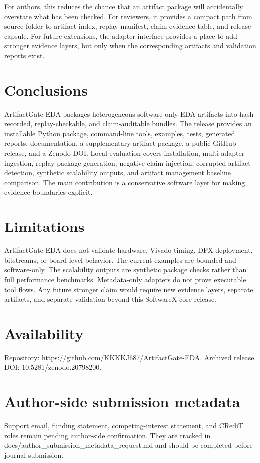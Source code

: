 \documentclass[preprint,12pt]{elsarticle}
\begin{document}
For authors, this reduces the chance that an artifact package will accidentally
overstate what has been checked. For reviewers, it provides a compact path from
source folder to artifact index, replay manifest, claim-evidence table, and
release capsule. For future extensions, the adapter interface provides a place
to add stronger evidence layers, but only when the corresponding artifacts and
validation reports exist.

\section{Conclusions}
ArtifactGate-EDA packages heterogeneous software-only EDA artifacts into
hash-recorded, replay-checkable, and claim-auditable bundles. The release
provides an installable Python package, command-line tools, examples, tests,
generated reports, documentation, a supplementary artifact package, a public
GitHub release, and a Zenodo DOI. Local evaluation covers installation,
multi-adapter ingestion, replay package generation, negative claim injection,
corrupted artifact detection, synthetic scalability outputs, and artifact
management baseline comparison. The main contribution is a conservative
software layer for making evidence boundaries explicit.

\section{Limitations}
ArtifactGate-EDA does not validate hardware, Vivado timing, DFX deployment,
bitstreams, or board-level behavior. The current examples are bounded and
software-only. The scalability outputs are synthetic package checks rather than
full performance benchmarks. Metadata-only adapters do not prove executable
tool flows. Any future stronger claim would require new evidence layers,
separate artifacts, and separate validation beyond this SoftwareX core release.

\section{Availability}
Repository: \url{https://github.com/KKKKJ687/ArtifactGate-EDA}. Archived release DOI: 10.5281/zenodo.20798200.

\section*{Author-side submission metadata}
Support email, funding statement, competing-interest statement, and CRediT roles
remain pending author-side confirmation. They are tracked in
docs/author\_submission\_metadata\_request.md and should be completed before
journal submission.
\end{document}
